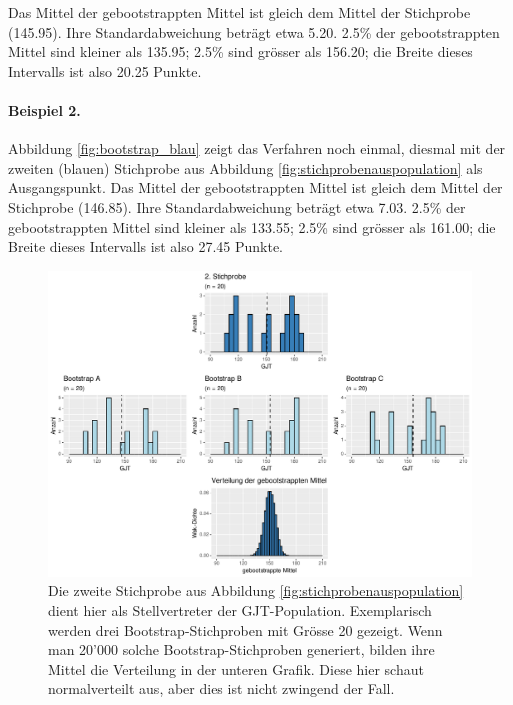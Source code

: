 \documentclass[oneside, 10pt]{book}\usepackage[]{graphicx}\usepackage[]{xcolor}
\newenvironment{knitrout}{}{} %
\begin{document}
Das Mittel der gebootstrappten Mittel ist gleich dem Mittel
der Stichprobe (145.95).
Ihre Standardabweichung beträgt etwa 5.20.
2.5\% der gebootstrappten Mittel sind kleiner als 135.95;
2.5\% sind grösser als 156.20;
die Breite dieses Intervalls ist also 20.25 Punkte.

\paragraph{Beispiel 2.}
Abbildung \vref{fig:bootstrap_blau} zeigt das Verfahren noch einmal,
diesmal mit der zweiten (blauen) Stichprobe aus Abbildung
\ref{fig:stichprobenauspopulation} als Ausgangspunkt.
Das Mittel der gebootstrappten Mittel ist gleich dem Mittel
der Stichprobe (146.85).
Ihre Standardabweichung beträgt etwa 7.03.
2.5\% der gebootstrappten Mittel sind kleiner als 133.55;
2.5\% sind grösser als 161.00;
die Breite dieses Intervalls ist also 27.45 Punkte.

\begin{knitrout}
\color{fgcolor}\begin{figure}[tp]

{\centering \includegraphics[width=\textwidth]{figs/unnamed-chunk-143-1} 

}

\caption{Die zweite Stichprobe aus Abbildung \ref{fig:stichprobenauspopulation} dient hier als Stellvertreter der GJT-Population. Exemplarisch werden drei Bootstrap-Stichproben mit Grösse 20 gezeigt. Wenn man 20'000 solche Bootstrap-Stichproben generiert, bilden ihre Mittel die Verteilung in der unteren Grafik. Diese hier schaut normalverteilt aus, aber dies ist nicht zwingend der Fall.\label{fig:bootstrap_blau}}\label{fig:unnamed-chunk-143}
\end{figure}

\end{knitrout}
\end{document}
